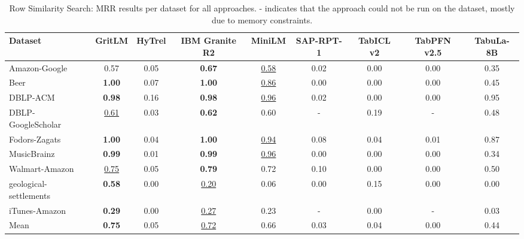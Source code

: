 \begin{table}[t]
\centering
\begin{tabular*}{\textwidth}{lcccccccc}
\hline
Dataset & GritLM & HyTrel & IBM Granite R2 & MiniLM & SAP-RPT-1 & TabICL v2 & TabPFN v2.5 & TabuLa-8B \\
\hline
Amazon-Google & 0.57 & 0.05 & \textbf{0.67} & \underline{0.58} & 0.02 & 0.00 & 0.00 & 0.35 \\
Beer & \textbf{1.00} & 0.07 & \textbf{1.00} & \underline{0.86} & 0.00 & 0.00 & 0.00 & 0.45 \\
DBLP-ACM & \textbf{0.98} & 0.16 & \textbf{0.98} & \underline{0.96} & 0.02 & 0.00 & 0.00 & 0.95 \\
DBLP-GoogleScholar & \underline{0.61} & 0.03 & \textbf{0.62} & 0.60 & - & 0.19 & - & 0.48 \\
Fodors-Zagats & \textbf{1.00} & 0.04 & \textbf{1.00} & \underline{0.94} & 0.08 & 0.04 & 0.01 & 0.87 \\
MusicBrainz & \textbf{0.99} & 0.01 & \textbf{0.99} & \underline{0.96} & 0.00 & 0.00 & 0.00 & 0.34 \\
Walmart-Amazon & \underline{0.75} & 0.05 & \textbf{0.79} & 0.72 & 0.10 & 0.00 & 0.00 & 0.50 \\
geological-settlements & \textbf{0.58} & 0.00 & \underline{0.20} & 0.06 & 0.00 & 0.15 & 0.00 & 0.00 \\
iTunes-Amazon & \textbf{0.29} & 0.00 & \underline{0.27} & 0.23 & - & 0.00 & - & 0.03 \\
Mean & \textbf{0.75} & 0.05 & \underline{0.72} & 0.66 & 0.03 & 0.04 & 0.00 & 0.44 \\
\hline
\end{tabular*}
\caption{Row Similarity Search: MRR results per dataset for all approaches. - indicates that the approach could not be run on the dataset, mostly due to memory constraints.}
\label{tab:row_sim_per_dataset}
\end{table}
